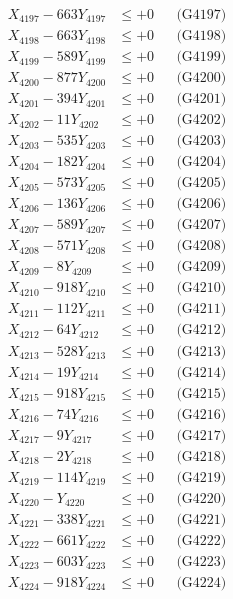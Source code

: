 \documentclass[a4paper,10pt]{article}
\begin{document}
{\begin{align}
X_{4197} - 663Y_{4197} &\leq +0 && \text{(G4197)} \\
X_{4198} - 663Y_{4198} &\leq +0 && \text{(G4198)} \\
X_{4199} - 589Y_{4199} &\leq +0 && \text{(G4199)} \\
X_{4200} - 877Y_{4200} &\leq +0 && \text{(G4200)} \\
\allowbreak
X_{4201} - 394Y_{4201} &\leq +0 && \text{(G4201)} \\
X_{4202} - 11Y_{4202} &\leq +0 && \text{(G4202)} \\
X_{4203} - 535Y_{4203} &\leq +0 && \text{(G4203)} \\
X_{4204} - 182Y_{4204} &\leq +0 && \text{(G4204)} \\
X_{4205} - 573Y_{4205} &\leq +0 && \text{(G4205)} \\
X_{4206} - 136Y_{4206} &\leq +0 && \text{(G4206)} \\
X_{4207} - 589Y_{4207} &\leq +0 && \text{(G4207)} \\
X_{4208} - 571Y_{4208} &\leq +0 && \text{(G4208)} \\
X_{4209} - 8Y_{4209} &\leq +0 && \text{(G4209)} \\
X_{4210} - 918Y_{4210} &\leq +0 && \text{(G4210)} \\
\allowbreak
X_{4211} - 112Y_{4211} &\leq +0 && \text{(G4211)} \\
X_{4212} - 64Y_{4212} &\leq +0 && \text{(G4212)} \\
X_{4213} - 528Y_{4213} &\leq +0 && \text{(G4213)} \\
X_{4214} - 19Y_{4214} &\leq +0 && \text{(G4214)} \\
X_{4215} - 918Y_{4215} &\leq +0 && \text{(G4215)} \\
X_{4216} - 74Y_{4216} &\leq +0 && \text{(G4216)} \\
X_{4217} - 9Y_{4217} &\leq +0 && \text{(G4217)} \\
X_{4218} - 2Y_{4218} &\leq +0 && \text{(G4218)} \\
X_{4219} - 114Y_{4219} &\leq +0 && \text{(G4219)} \\
X_{4220} - Y_{4220} &\leq +0 && \text{(G4220)} \\
\allowbreak
X_{4221} - 338Y_{4221} &\leq +0 && \text{(G4221)} \\
X_{4222} - 661Y_{4222} &\leq +0 && \text{(G4222)} \\
X_{4223} - 603Y_{4223} &\leq +0 && \text{(G4223)} \\
X_{4224} - 918Y_{4224} &\leq +0 && \text{(G4224)} \\

\end{align}}
\end{document}
